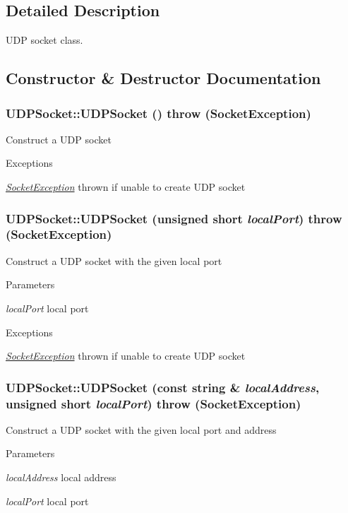 \subsection{Detailed Description}
UDP socket class. 

\subsection{Constructor \& Destructor Documentation}
\hypertarget{classUDPSocket_a4f86f3023f5a08f6355802599a10e100}{
\subsubsection[{UDPSocket}]{\setlength{\rightskip}{0pt plus 5cm}UDPSocket::UDPSocket ()  throw ({\bf SocketException})}}
\label{classUDPSocket_a4f86f3023f5a08f6355802599a10e100}
Construct a UDP socket 
\begin{DoxyExceptions}{Exceptions}
\item[{\em \hyperlink{classSocketException}{SocketException}}]thrown if unable to create UDP socket \end{DoxyExceptions}
\hypertarget{classUDPSocket_a14dcb55c4b60b12d4a7fff648cbb825f}{
\subsubsection[{UDPSocket}]{\setlength{\rightskip}{0pt plus 5cm}UDPSocket::UDPSocket (unsigned short {\em localPort})  throw ({\bf SocketException})}}
\label{classUDPSocket_a14dcb55c4b60b12d4a7fff648cbb825f}
Construct a UDP socket with the given local port 
\begin{DoxyParams}{Parameters}
\item[{\em localPort}]local port \end{DoxyParams}

\begin{DoxyExceptions}{Exceptions}
\item[{\em \hyperlink{classSocketException}{SocketException}}]thrown if unable to create UDP socket \end{DoxyExceptions}
\hypertarget{classUDPSocket_af19281c523f15ed30d7d78f09033713d}{
\subsubsection[{UDPSocket}]{\setlength{\rightskip}{0pt plus 5cm}UDPSocket::UDPSocket (const string \& {\em localAddress}, \/  unsigned short {\em localPort})  throw ({\bf SocketException})}}
\label{classUDPSocket_af19281c523f15ed30d7d78f09033713d}
Construct a UDP socket with the given local port and address 
\begin{DoxyParams}{Parameters}
\item[{\em localAddress}]local address \item[{\em localPort}]local port \end{DoxyParams}

